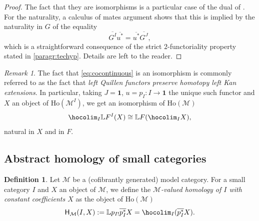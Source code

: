 \documentclass[reqno]{amsart}
\theoremstyle{plain}
\theoremstyle{definition}
\newtheorem{definition}[subsubsection]{Definition}
\theoremstyle{remark}
\newtheorem{remark}[subsubsection]{Remark}
\newcommand{\M}{\mathcal{M}}
\newcommand{\fun}[2]{{#2}^{#1}} %
\newcommand{\ctg}[1]{\mathbf{#1}}  %
\newcommand{\Term}{\ctg{1}} %
\newcommand{\functor}[1]{\mathsf{#1}} %
\newcommand{\Ho}{\functor{H}} %
\newcommand{\LL}{\mathbb{L}} %
\newcommand{\Loc}[1]{\mathrm{Ho}(#1)} %
\newcommand{\GZ}[1]{\overline{#1}} %
\newcommand{\nbd}{\nobreakdash} %
\begin{document}
\begin{proof}
 The fact that they are isomorphisms is a particular case of the dual
 of \cite[Proposition 6.12]{cisinski:images}. For the naturality, a
 calculus of mates argument shows that this is implied by the naturality
 in $G$
 of the equality
 \[
   \GZ{\fun{I}{G}}\GZ{u^*}=\GZ{u^*}\GZ{\fun{J}{G}},
 \]
 which is a straightforward consequence of the strict
 $2$\nbd-functoriality property stated in \ref{paragr:techyp}. Details
 are left to the reader.
\end{proof}
\begin{remark}
  The fact that \eqref{eq:cocontinuous} is an isomorphism is commonly
  referred to as the fact that \emph{left Quillen functors preserve
    homotopy left Kan extensions}. In particular, taking $J=\Term$,
  $u=p_I \colon I \to \Term$ the unique such functor and $X$ an
  object of $\Loc{\fun{I}{\M}}$, we get an isomorphism of $\Loc{\M}$
  \begin{equation}\label{eq:htpycolim}
    \hocolim_I \LL \fun{I}{F}(X) \cong \LL F (\hocolim_I X),
  \end{equation}
  natural in $X$ and in $F$.
\end{remark}
\subsection{Abstract homology of small categories}\label{abstracthom}
\begin{definition}\label{def:abstracthom}
  Let $\M$ be a (cofibrantly generated) model category. For a small
  category $I$ and $X$ an object of $\M$, we define the \emph{$\M$\nbd-valued
    homology of $I$ with constant coefficients $X$} as the object of $\Loc{\M}$
  \[
    \Ho_{\M}(I,X):=\LL p_{I!}\GZ{p_I^*}X=\hocolim_I (\GZ{p_I^*}X).
  \]
\end{definition}
\end{document}
